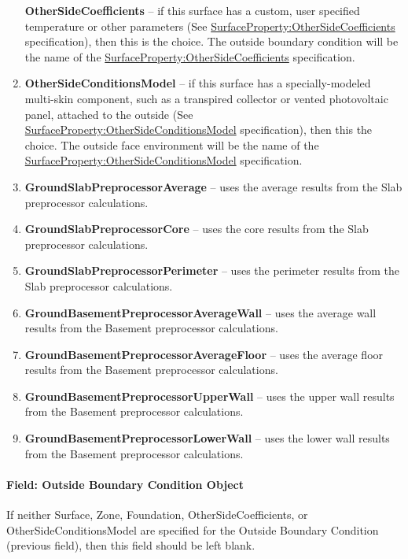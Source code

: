 \begin{enumerate}
    \textbf{OtherSideCoefficients} -- if this surface has a custom, user specified temperature or other parameters (See \hyperref[surfacepropertyothersidecoefficients]{SurfaceProperty:OtherSideCoefficients} specification), then this is the choice. The outside boundary condition will be the name of the \hyperref[surfacepropertyothersidecoefficients]{SurfaceProperty:OtherSideCoefficients} specification.
  \item
    \textbf{OtherSideConditionsModel} -- if this surface has a specially-modeled multi-skin component, such as a transpired collector or vented photovoltaic panel, attached to the outside (See \hyperref[surfacepropertyothersideconditionsmodel]{SurfaceProperty:OtherSideConditionsModel} specification), then this the choice. The outside face environment will be the name of the \hyperref[surfacepropertyothersideconditionsmodel]{SurfaceProperty:OtherSideConditionsModel} specification.
  \item
    \textbf{GroundSlabPreprocessorAverage} -- uses the average results from the Slab preprocessor calculations.
  \item
    \textbf{GroundSlabPreprocessorCore} -- uses the core results from the Slab preprocessor calculations.
  \item
    \textbf{GroundSlabPreprocessorPerimeter} -- uses the perimeter results from the Slab preprocessor calculations.
  \item
    \textbf{GroundBasementPreprocessorAverageWall} -- uses the average wall results from the Basement preprocessor calculations.
  \item
    \textbf{GroundBasementPreprocessorAverageFloor} -- uses the average floor results from the Basement preprocessor calculations.
  \item
    \textbf{GroundBasementPreprocessorUpperWall} -- uses the upper wall results from the Basement preprocessor calculations.
  \item
    \textbf{GroundBasementPreprocessorLowerWall} -- uses the lower wall results from the Basement preprocessor calculations.
\end{enumerate}

\paragraph{Field: Outside Boundary Condition Object}\label{field-outside-boundary-condition-object-7}

If neither Surface, Zone, Foundation, OtherSideCoefficients, or OtherSideConditionsModel are specified for the Outside Boundary Condition (previous field), then this field should be left blank.

